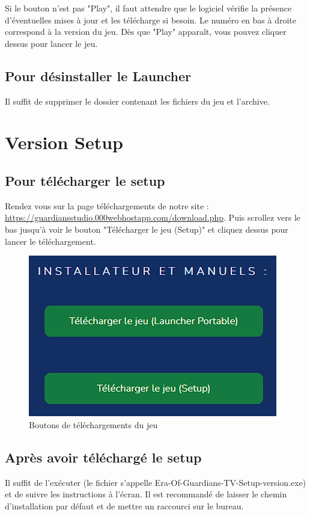 \documentclass[a4paper, 12pt]{article}
\begin{document}
	Si le bouton n'est pas "Play", il faut attendre que le logiciel vérifie la présence d'éventuelles mises à jour et les télécharge si besoin. Le numéro en bas à droite correspond à la version du jeu. Dès que "Play" apparaît, vous pouvez cliquer dessus pour lancer le jeu.
	
	
	
	\subsection{Pour désinstaller le Launcher}
	Il suffit de supprimer le dossier contenant les fichiers du jeu et l'archive.
	
	\section{Version Setup}
	\subsection{Pour télécharger le setup}
	Rendez vous sur la page téléchargements de notre site :
	\url{https://guardiansstudio.000webhostapp.com/download.php}.
	Puis scrollez vers le bas jusqu'à voir le bouton "Télécharger le jeu (Setup)" et cliquez dessus pour lancer le téléchargement.
	
	\begin{figure}[ht]
		\centering
		\includegraphics[scale=0.6]{images/download_launcher.png}
		\caption{Boutons de téléchargements du jeu}
	\end{figure}
	
	\subsection{Après avoir téléchargé le setup}
	Il suffit de l'exécuter (le fichier s'appelle Era-Of-Guardians-TV-Setup-version.exe) et de suivre les instructions à l'écran.
	Il est recommandé de laisser le chemin d'installation par défaut et de mettre un raccourci sur le bureau.
\end{document}
